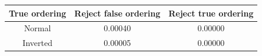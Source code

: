 \begin{tabular}{| c | c | c |}
\hline
True ordering & Reject false ordering & Reject true ordering \\
\hline
Normal & 0.00040 & 0.00000 \\
Inverted & 0.00005 & 0.00000 \\
\hline
\end{tabular}
